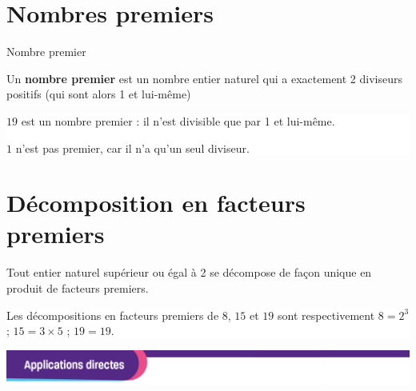 \section{ Nombres premiers }

\begin{DefTB}{Nombre premier} 

\hspace{1mm}
\begin{minipage}{0.98\linewidth}
Un \textbf{nombre premier} est un nombre entier naturel qui a exactement 2 diviseurs positifs (qui sont alors 1 et lui-même) 
\end{minipage}

  \vspace{3mm}
\colorbox{white}{
\begin{minipage}{0.98\linewidth}

$19$ est un nombre premier :  il n'est divisible que par 1 et lui-même.

  $1$ n'est pas premier, car il n'a qu'un seul diviseur.  
 \end{minipage}
}
\end{DefTB}



\section{ Décomposition en facteurs premiers }

\begin{Th}

\hspace{1mm}
\begin{minipage}{0.98\linewidth}
  Tout entier naturel supérieur ou égal à 2 se décompose de façon unique en produit de facteurs premiers. 
\end{minipage}

\vspace{3mm}
\colorbox{white}{
\begin{minipage}{0.98\linewidth}

Les décompositions en facteurs premiers de $8$, $15$ et $19$ sont respectivement  
$8=2^3$ ; $15=3 \times 5$ ; $19=19$.
 \end{minipage}
}
\end{Th}


\newpage

\includegraphics[scale=0.5]{../MISC/pageAd.png} 



